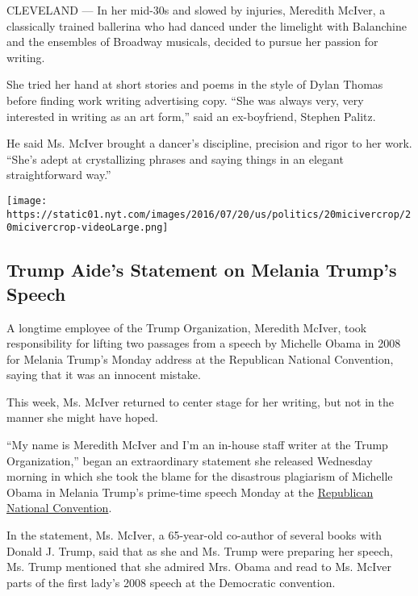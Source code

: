CLEVELAND --- In her mid-30s and slowed by injuries, Meredith McIver, a
classically trained ballerina who had danced under the limelight with
Balanchine and the ensembles of Broadway musicals, decided to pursue her
passion for writing.

She tried her hand at short stories and poems in the style of Dylan
Thomas before finding work writing advertising copy. ``She was always
very, very interested in writing as an art form,'' said an ex-boyfriend,
Stephen Palitz.

He said Ms. McIver brought a dancer's discipline, precision and rigor to
her work. ``She's adept at crystallizing phrases and saying things in an
elegant straightforward way.''

\href{https://www.nytimes.com/interactive/2016/07/20/us/politics/trum-aide-statement.html}{}

\texttt{[image: https://static01.nyt.com/images/2016/07/20/us/politics/20micivercrop/20micivercrop-videoLarge.png]}

\hypertarget{trump-aides-statement-on-melania-trumps-speech}{%
\subsection{Trump Aide's Statement on Melania Trump's
Speech}\label{trump-aides-statement-on-melania-trumps-speech}}

A longtime employee of the Trump Organization, Meredith McIver, took
responsibility for lifting two passages from a speech by Michelle Obama
in 2008 for Melania Trump's Monday address at the Republican National
Convention, saying that it was an innocent mistake.

This week, Ms. McIver returned to center stage for her writing, but not
in the manner she might have hoped.

``My name is Meredith McIver and I'm an in-house staff writer at the
Trump Organization,'' began an extraordinary statement she released
Wednesday morning in which she took the blame for the disastrous
plagiarism of Michelle Obama in Melania Trump's prime-time speech Monday
at the
\href{http://www.nytimes.com/2016/07/21/us/politics/republican-national-convention.html}{Republican
National Convention}.

In the statement, Ms. McIver, a 65-year-old co-author of several books
with Donald J. Trump, said that as she and Ms. Trump were preparing her
speech, Ms. Trump mentioned that she admired Mrs. Obama and read to Ms.
McIver parts of the first lady's 2008 speech at the Democratic
convention.

